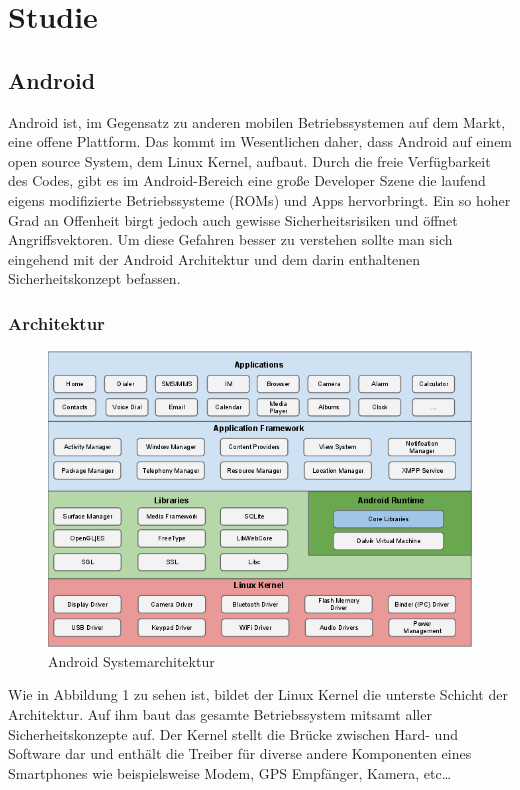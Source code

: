 \chapter{Studie}
\section{Android}
Android ist, im Gegensatz zu anderen mobilen Betriebssystemen auf dem Markt, eine offene Plattform. Das kommt im Wesentlichen daher, dass Android auf einem open source System, dem Linux Kernel, aufbaut. Durch die freie Verfügbarkeit des Codes, gibt es im Android-Bereich eine große Developer Szene die laufend eigens modifizierte Betriebssysteme (ROMs) und Apps hervorbringt.
Ein so hoher Grad an Offenheit birgt jedoch auch gewisse Sicherheitsrisiken und öffnet Angriffsvektoren. Um diese Gefahren besser zu verstehen sollte man sich eingehend mit der Android Architektur und dem darin enthaltenen Sicherheitskonzept befassen.

\subsection{Architektur}
\begin{figure}[H]
\centering
\includegraphics[scale=0.7]{Images/android_stack}
\caption{Android Systemarchitektur}
\end{figure}
Wie in Abbildung 1 zu sehen ist, bildet der Linux Kernel die unterste Schicht der Architektur. Auf ihm baut das gesamte Betriebssystem mitsamt aller Sicherheitskonzepte auf. Der Kernel stellt die Brücke zwischen Hard- und Software dar und enthält die Treiber für diverse andere Komponenten eines Smartphones wie beispielsweise Modem, GPS Empfänger, Kamera, etc… 

